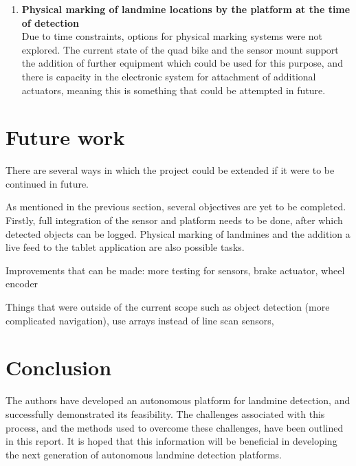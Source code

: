 \documentclass[main.tex]{subfiles}
\begin{document}
\begin{enumerate}
\item \textbf{Physical marking of landmine locations by the platform at the time of detection}\\ 
Due to time constraints, options for physical marking systems were not explored. The current state of the quad bike and the sensor mount support the addition of further equipment which could be used for this purpose, and there is capacity in the electronic system for attachment of additional actuators, meaning this is something that could be attempted in future.  
\end{enumerate}

\section{Future work}
There are several ways in which the project could be extended if it were to be continued in future. 

As mentioned in the previous section, several objectives are yet to be completed. Firstly, full integration of the sensor and platform needs to be done, after which detected objects can be logged. Physical marking of landmines and the addition a live feed to the tablet application are also possible tasks.

Improvements that can be made: more testing for sensors, brake actuator, wheel encoder

Things that were outside of the current scope such as object detection (more complicated navigation), use arrays instead of line scan sensors, 

\section{Conclusion}
The authors have developed an autonomous platform for landmine detection, and successfully demonstrated its feasibility. The challenges associated with this process, and the methods used to overcome these challenges, have been outlined in this report. It is hoped that this information will be beneficial in developing the next generation of autonomous landmine detection platforms.  
\end{document}
